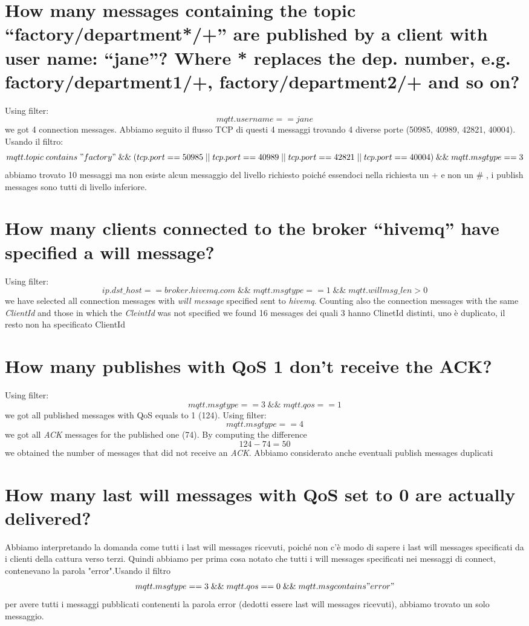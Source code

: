 \documentclass{article}
\begin{document}
\section{How many messages containing the topic
“factory/department*/+” are published by a client with
user name: “jane”? Where * replaces the dep. number,
e.g. factory/department1/+, factory/department2/+
and so on?}
Using filter: \[ mqtt.username == jane\] we got 4 connection messages. Abbiamo seguito il flusso TCP di questi 4 messaggi trovando 4 diverse porte (50985, 40989, 42821, 40004). \hfill \break
Usando il filtro: \[ mqtt.topic \; contains \; "factory" \; \&\& \; ( tcp.port == 50985 \; || \; tcp.port == 40989 \; || \; tcp.port == 42821 \; || \; tcp.port == 40004 ) \; \&\& \; mqtt.msgtype == 3 \] 
abbiamo trovato 10 messaggi ma non esiste alcun messaggio del livello richiesto poiché essendoci nella richiesta un + e non un \# , i publish messages sono tutti di livello inferiore.

\section{How many clients connected to the broker “hivemq”
have specified a will message?}
Using filter: \[ ip.dst\_host == broker.hivemq.com \; \&\& \; mqtt.msgtype == 1 \; \&\& \; mqtt.willmsg\_len > 0 \] we have selected
all connection messages with \textit{will message} specified sent to \textit{hivemq}. Counting also the connection messages with the same \textit{ClientId} and those in which the \textit{CleintId} was not specified we found 16 messages
dei quali 3 hanno ClinetId distinti, uno è duplicato, il resto non ha specificato ClientId

\section{How many publishes with QoS 1 don't receive the ACK?}
Using filter: \[ mqtt.msgtype == 3 \; \&\& \; mqtt.qos == 1 \] we got all published messages with QoS equals to 1 (124). \hfill \break
Using filter: \[ mqtt.msgtype == 4 \] we got all \textit{ACK} messages for the published one (74). \hfill \break
By computing the difference \[ 124-74 = 50\] we obtained the number of messages that did not receive an \textit{ACK}.
Abbiamo considerato anche eventuali publish messages duplicati

\section{How many last will messages with QoS set to 0 are
actually delivered?}
Abbiamo interpretando la domanda come tutti i last will messages ricevuti, poiché non c'è modo di sapere i last will messages specificati da i clienti della cattura verso terzi. Quindi abbiamo per prima cosa notato che tutti i will messages specificati nei messaggi di connect, contenevano 
la parola "error".Usando il filtro \[ mqtt.msgtype == 3 \; \&\& \; mqtt.qos == 0 \; \&\& \; mqtt.msg contains "error" \]
per avere tutti i messaggi pubblicati contenenti la parola error (dedotti essere last will messages ricevuti), abbiamo trovato un solo messaggio.
\end{document}
